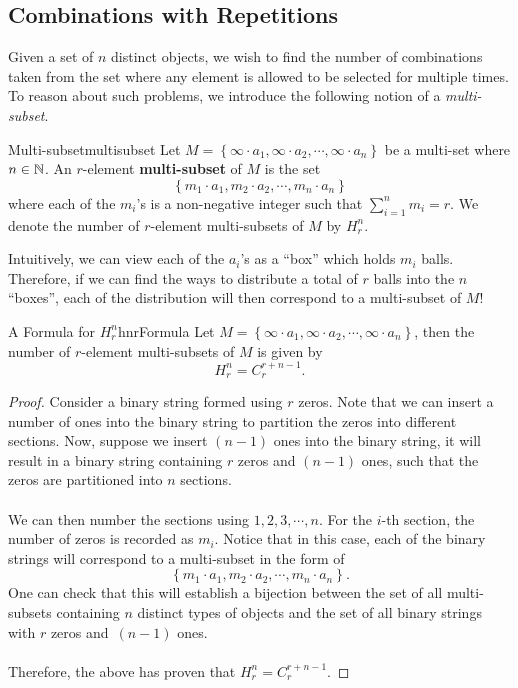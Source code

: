 \documentclass[math]{amznotes}
\theoremstyle{remark}
\begin{document}
\subsection{Combinations with Repetitions}
Given a set of $n$ distinct objects, we wish to find the number of combinations taken from the set where any element is allowed to be selected for multiple times. To reason about such problems, we introduce the following notion of a \textit{multi-subset}.
\begin{dfnbox}{Multi-subset}{multisubset}
    Let $M = \left\{\infty \cdot a_1, \infty \cdot a_2, \cdots, \infty \cdot a_n\right\}$ be a multi-set where $n \in \mathbb{N}$. An $r$-element {\color{red} \textbf{multi-subset}} of $M$ is the set
    \begin{displaymath}
        \left\{m_1 \cdot a_1, m_2 \cdot a_2, \cdots, m_n \cdot a_n\right\}
    \end{displaymath}
    where each of the $m_i$'s is a non-negative integer such that $\sum_{i = 1}^{n}m_i = r$. We denote the number of $r$-element multi-subsets of $M$ by $H^n_r$.
\end{dfnbox}
Intuitively, we can view each of the $a_i$'s as a ``box'' which holds $m_i$ balls. Therefore, if we can find the ways to distribute a total of $r$ balls into the $n$ ``boxes'', each of the distribution will then correspond to a multi-subset of $M$!
\begin{probox}{A Formula for $H^n_r$}{hnrFormula}
    Let $M = \left\{\infty \cdot a_1, \infty \cdot a_2, \cdots, \infty \cdot a_n\right\}$, then the number of $r$-element multi-subsets of $M$ is given by
    \begin{equation*}
        H^n_r = C^{r + n - 1}_r.
    \end{equation*}
    \tcblower
    \begin{proof}
        Consider a binary string formed using $r$ zeros. Note that we can insert a number of ones into the binary string to partition the zeros into different sections. Now, suppose we insert $(n - 1)$ ones into the binary string, it will result in a binary string containing $r$ zeros and $(n - 1)$ ones, such that the zeros are partitioned into $n$ sections.
        \\\\
        We can then number the sections using $1, 2, 3, \cdots, n$. For the $i$-th section, the number of zeros is recorded as $m_i$. Notice that in this case, each of the binary strings will correspond to a multi-subset in the form of 
        \begin{displaymath}
            \left\{m_1 \cdot a_1, m_2 \cdot a_2, \cdots, m_n \cdot a_n\right\}.
        \end{displaymath}
        One can check that this will establish a bijection between the set of all multi-subsets containing $n$ distinct types of objects and the set of all binary strings with $r$ zeros and~$(n - 1)$ ones.
        \\\\
        Therefore, the above has proven that $H^n_r = C^{r + n - 1}_r$.
    \end{proof}
\end{probox}
\end{document}
